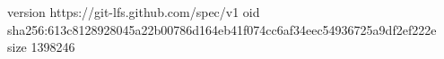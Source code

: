 version https://git-lfs.github.com/spec/v1
oid sha256:613c8128928045a22b00786d164eb41f074cc6af34eec54936725a9df2ef222e
size 1398246
